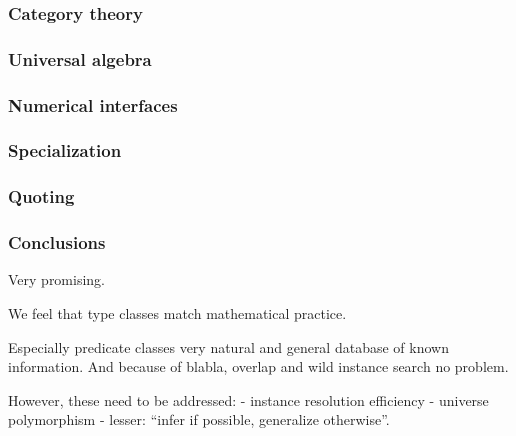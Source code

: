 \documentclass{beamer}
\begin{document}

\begin{frame}
\frametitle{Category theory}
\end{frame}

\begin{frame}
\frametitle{Universal algebra}

\end{frame}


\begin{frame}
\frametitle{Numerical interfaces}

\end{frame}

\begin{frame}
\frametitle{Specialization} %
\end{frame}

\begin{frame}
\frametitle{Quoting} %
\end{frame}


\begin{frame}
\frametitle{Conclusions}

Very promising.

We feel that type classes match mathematical practice.

Especially predicate classes very natural and general database of known information. And because of blabla, overlap and wild instance search no problem.

However, these need to be addressed:
- instance resolution efficiency
- universe polymorphism
- lesser: ``infer if possible, generalize otherwise''.

\end{frame}

\begin{frame}
\end{frame}
\end{document}
